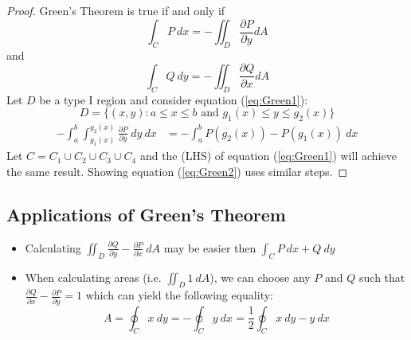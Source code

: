 \documentclass[../main.tex]{subfiles}
\begin{document}
\begin{proof}
Green's Theorem is true if and only if
\begin{equation}\label{eq:Green1}
\int_C{P\ dx} = -\iint_D{\frac{\partial P}{\partial y} dA}
\end{equation}
and
\begin{equation}\label{eq:Green2}
\int_C{Q\ dy} = -\iint_D{\frac{\partial Q}{\partial x} dA}
\end{equation}
Let $D$ be a type I region and consider equation (\ref{eq:Green1}):
\begin{equation*}
D = \{(x,y): a \le x \le b \text{ and } g_1(x) \le y \le g_2(x)\}
\end{equation*}
\begin{align*}
-\int_a^b{\int_{g_1(x)}^{g_2(x)}{\frac{\partial P}{\partial y}\ dy\ dx}} &= -\int_a^b{P(g_2(x))-P(g_1(x))\ dx} 
\end{align*}
Let $C = C_1 \cup C_2 \cup C_3 \cup C_4$ and the (LHS) of equation (\ref{eq:Green1}) will achieve the same result. Showing equation (\ref{eq:Green2}) uses similar steps.
\end{proof}
\subsection{Applications of Green's Theorem}
\begin{itemize}
	\item Calculating $\iint_D{\frac{\partial Q}{\partial y} - \frac{\partial P}{\partial x}\ dA}$ may be easier then $\int_C{P\ dx + Q\ dy}$
	\item When calculating areas (i.e. $\iint_D{1\ dA}$), we can choose any $P$ and $Q$ such that $\frac{\partial Q}{\partial x} - \frac{\partial P}{\partial y} = 1$ which can yield the following equality:
	\begin{equation*}
	A = \oint_C{x\ dy} = -\oint_C{y\ dx} = \frac{1}{2}\oint_C{x\ dy - y\ dx}
	\end{equation*}
\end{itemize}
\end{document}
